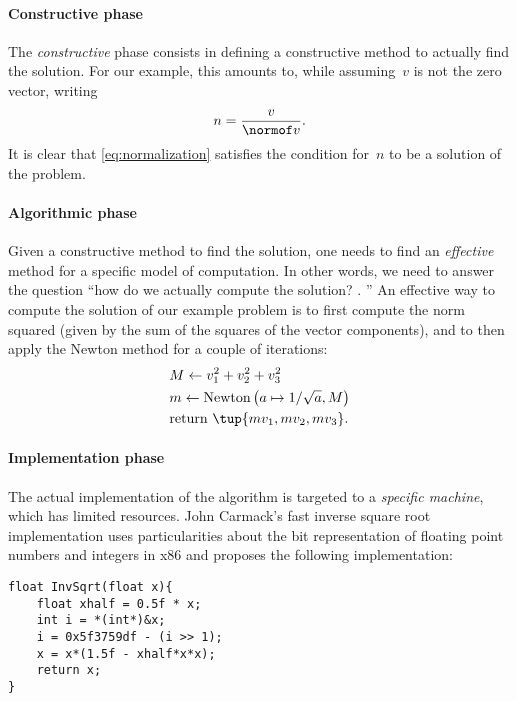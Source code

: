 \paragraph*{Constructive phase}
The \emph{constructive} phase consists in defining a constructive method to actually find the solution.
For our example, this amounts to, while assuming~$v$ is not the zero vector, writing
\begin{equation}
    \label{eq:normalization}
    n=\frac{v}{\normof v}.
\end{equation}
It is clear that \cref{eq:normalization} satisfies the condition for~$n$ to be a solution of the problem.
\paragraph*{Algorithmic phase}
Given a constructive method to find the solution, one needs to find an \emph{effective} method for a specific model of computation.
In other words, we need to answer the question ``how do we actually compute the solution?
.
''
An effective way to compute the solution of our example problem is to first compute the norm squared (given by the sum of the squares of the vector components), and to then apply the Newton method for a couple of iterations:
\begin{equation}
    \label{eq:newton_normalization}
    \begin{aligned}
         & M\leftarrow v_1^2+v_2^2+v_3^2 \\
         & m\leftarrow \text{Newton}\left(a\mapsto 1/\sqrt{a},M\right) \\
         & \text{return }\tup{mv_1,mv_2,mv_3}.
    \end{aligned}
\end{equation}
%

\paragraph*{Implementation phase}
The actual implementation of the algorithm is targeted to a \emph{specific machine}, which has limited resources.
John Carmack's fast inverse square root implementation uses particularities about the bit representation of floating point numbers and integers in x86 and proposes the following implementation:

\begin{center}
    \begin{verbatim}
float InvSqrt(float x){
    float xhalf = 0.5f * x;
    int i = *(int*)&x;
    i = 0x5f3759df - (i >> 1);
    x = x*(1.5f - xhalf*x*x);
    return x;
}
    \end{verbatim}
\end{center}

